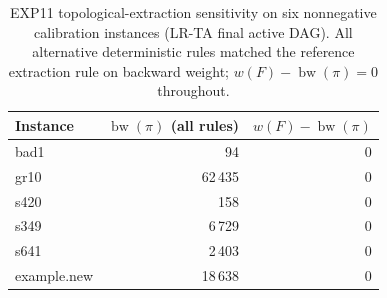 \begin{table}[t]
\centering
\caption{EXP11 topological-extraction sensitivity on six nonnegative calibration instances (LR-TA final active DAG). All alternative deterministic rules matched the reference extraction rule on backward weight; \(w(F)-\operatorname{bw}(\pi)=0\) throughout.}
\label{tab:exp11-extraction}
\begin{tabular}{lrr}
\toprule
Instance & \(\operatorname{bw}(\pi)\) (all rules) & \(w(F)-\operatorname{bw}(\pi)\) \\
\midrule
bad1 & 94 & 0 \\
gr10 & 62\,435 & 0 \\
s420 & 158 & 0 \\
s349 & 6\,729 & 0 \\
s641 & 2\,403 & 0 \\
example.new & 18\,638 & 0 \\
\bottomrule
\end{tabular}
\end{table}
